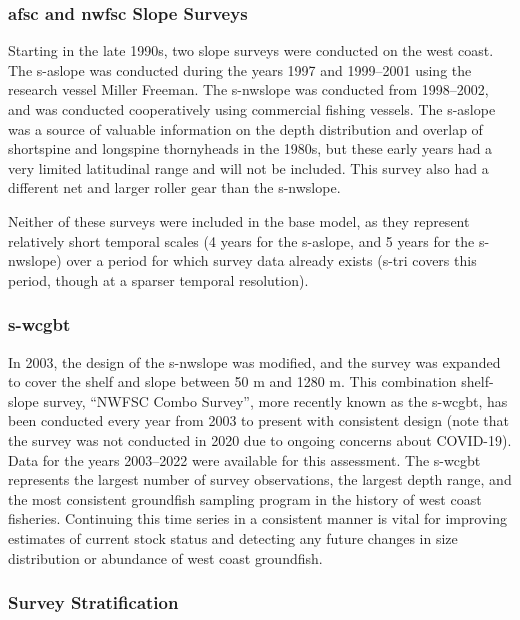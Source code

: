 \documentclass[11pt,
  letterpaper,
]{article}
\begin{document}
\hypertarget{and-slope-surveys}{%
\subsubsection{\texorpdfstring{\acrshort{afsc} and \acrshort{nwfsc} Slope Surveys}{ and  Slope Surveys}}\label{and-slope-surveys}}

Starting in the late 1990s, two slope surveys were conducted on the west coast. The \gls{s-aslope} was conducted during the years 1997 and 1999--2001 using the research vessel Miller Freeman. The \gls{s-nwslope} was conducted from 1998--2002, and was conducted cooperatively using commercial fishing vessels. The \gls{s-aslope} was a source of valuable information on the depth distribution and overlap of shortspine and longspine thornyheads in the 1980s, but these early years had a very limited latitudinal range and will not be included. This survey also had a different net and larger roller gear than the \gls{s-nwslope}.

Neither of these surveys were included in the base model, as they represent relatively short temporal scales (4 years for the \gls{s-aslope}, and 5 years for the \gls{s-nwslope}) over a period for which survey data already exists (\gls{s-tri} covers this period, though at a sparser temporal resolution).

\hypertarget{section-1}{%
\subsubsection{\texorpdfstring{\acrlong{s-wcgbt}}{}}\label{section-1}}

In 2003, the design of the \gls{s-nwslope} was modified, and the survey was expanded to cover the shelf and slope between 50 m and 1280 m. This combination shelf-slope survey, ``NWFSC Combo Survey'', more recently known as the \gls{s-wcgbt}, has been conducted every year from 2003 to present with consistent design (note that the survey was not conducted in 2020 due to ongoing concerns about COVID-19). Data for the years 2003--2022 were available for this assessment. The \gls{s-wcgbt} represents the largest number of survey observations, the largest depth range, and the most consistent groundfish sampling program in the history of west coast fisheries. Continuing this time series in a consistent manner is vital for improving estimates of current stock status and detecting any future changes in size distribution or abundance of west coast groundfish.

\hypertarget{survey-stratification}{%
\subsubsection{Survey Stratification}\label{survey-stratification}}
\end{document}
